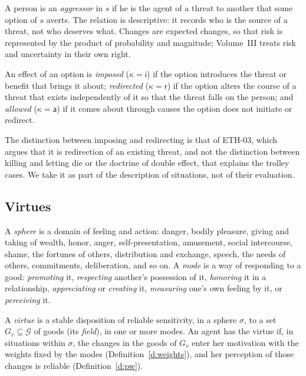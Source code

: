 \documentclass{situationist-preprint}
\newcommand{\Good}{\mathcal{G}}
\begin{document}
A person is an \emph{aggressor} in $s$ if he is the agent of a threat to another that some option of $s$ averts. The relation is descriptive: it records who is the source of a threat, not who deserves what. Changes are expected changes, so that risk is represented by the product of probability and magnitude; Volume~III treats risk and uncertainty in their own right.

\begin{definition}\label{d:role}
An effect of an option is \emph{imposed} ($\kappa=\mathsf{i}$) if the option introduces the threat or benefit that brings it about; \emph{redirected} ($\kappa=\mathsf{r}$) if the option alters the course of a threat that exists independently of it so that the threat falls on the person; and \emph{allowed} ($\kappa=\mathsf{a}$) if it comes about through causes the option does not initiate or redirect.
\end{definition}

The distinction between imposing and redirecting is that of ETH-03, which argues that it is redirection of an existing threat, and not the distinction between killing and letting die or the doctrine of double effect, that explains the trolley cases. We take it as part of the description of situations, not of their evaluation.

\subsection{Virtues}

\begin{definition}\label{d:mode}
A \emph{sphere} is a domain of feeling and action: danger, bodily pleasure, giving and taking of wealth, honor, anger, self-presentation, amusement, social intercourse, shame, the fortunes of others, distribution and exchange, speech, the needs of others, commitments, deliberation, and so on. A \emph{mode} is a way of responding to a good: \emph{promoting} it, \emph{respecting} another's possession of it, \emph{honoring} it in a relationship, \emph{appreciating} or \emph{creating} it, \emph{measuring} one's own feeling by it, or \emph{perceiving} it.
\end{definition}

\begin{definition}[Virtue]\label{d:virtue}
A \emph{virtue} is a stable disposition of reliable sensitivity, in a sphere $\sigma$, to a set $G_v\subseteq\Good$ of goods (its \emph{field}), in one or more modes. An agent has the virtue if, in situations within $\sigma$, the changes in the goods of $G_v$ enter her motivation with the weights fixed by the modes (Definition~\ref{d:weights}), and her perception of those changes is reliable (Definition~\ref{d:pw}).
\end{definition}
\end{document}
